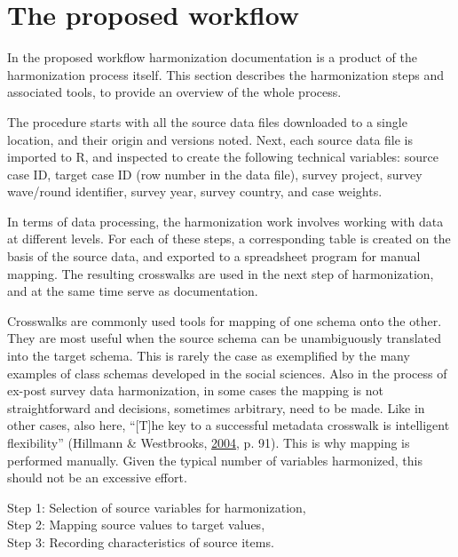 \documentclass[12pt,]{article}
\begin{document}
\hypertarget{the-proposed-workflow}{%
\section{The proposed workflow}\label{the-proposed-workflow}}

In the proposed workflow harmonization documentation is a product of the harmonization process itself. This section describes the harmonization steps and associated tools, to provide an overview of the whole process.

The procedure starts with all the source data files downloaded to a single location, and their origin and versions noted. Next, each source data file is imported to R, and inspected to create the following technical variables: source case ID, target case ID (row number in the data file), survey project, survey wave/round identifier, survey year, survey country, and case weights.

In terms of data processing, the harmonization work involves working with data at different levels. For each of these steps, a corresponding table is created on the basis of the source data, and exported to a spreadsheet program for manual mapping. The resulting crosswalks are used in the next step of harmonization, and at the same time serve as documentation.

Crosswalks are commonly used tools for mapping of one schema onto the other. They are most useful when the source schema can be unambiguously translated into the target schema. This is rarely the case as exemplified by the many examples of class schemas developed in the social sciences. Also in the process of ex-post survey data harmonization, in some cases the mapping is not straightforward and decisions, sometimes arbitrary, need to be made. Like in other cases, also here, ``{[}T{]}he key to a successful metadata crosswalk is intelligent flexibility'' (Hillmann \& Westbrooks, \protect\hyperlink{ref-Hillmann2004}{2004}, p. 91). This is why mapping is performed manually. Given the typical number of variables harmonized, this should not be an excessive effort.

\parindent 0in

Step 1: Selection of source variables for harmonization,\\
Step 2: Mapping source values to target values,\\
Step 3: Recording characteristics of source items.

\parindent 0.5in
\end{document}
